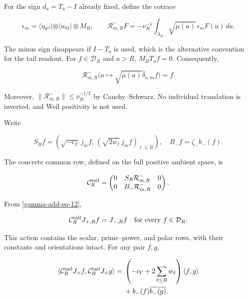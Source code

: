 For the sign \(d_a=T_a-I\) already fixed, define the cotrace

\begin{equation}
\epsilon_m=\langle\eta_{9^m}|\otimes\langle u_{81}|\otimes M_R,
\qquad
\mathcal R^-_{m,R}F
=-\nu_R^{-1}\int_{A_R}\sqrt{\mu(a)}\,\epsilon_m F(a)\,da.
\label{gamma-add-eq-11}
\end{equation}

The minus sign disappears if \(I-T_a\) is used, which is the alternative convention for the tail readout. For \(f\in\mathcal D_R\) and \(a>R\), \(M_RT_af=0\). Consequently,

\begin{equation}
\mathcal R^-_{m,R}
\bigl(a\mapsto\sqrt{\mu(a)}\widehat\delta_{a,m}f\bigr)=f.
\label{gamma-add-eq-12}
\end{equation}
\label{gamma-add:cola-lector}

Moreover, \(\|\mathcal R^-_{m,R}\|\le\nu_R^{-1/2}\) by Cauchy--Schwarz. No individual translation is inverted, and Weil positivity is not used.

Write

\begin{equation}
S_Rf=\left(\sqrt{-c_\Gamma}\,j_mf,\,
              (\sqrt{2w_\ell}\,j_mf)_{\ell\le R}\right),
\quad B_-f=\zeta_-b_-(f).
\label{gamma-add-display-28}
\end{equation}

The concrete common row, defined on the full positive ambient space, is

\begin{equation}
\mathcal C_R^{\rm tail}
=
\begin{pmatrix}
0&S_R\mathcal R^-_{m,R}&0\\
0&B_-\mathcal R^-_{m,R}&0
\end{pmatrix}.
\label{gamma-add-eq-13}
\end{equation}

From \eqref{gamma-add-eq-12},

\begin{equation}
\mathcal C_R^{\rm tail}J_{+,R}f=J_{-,R}f
\quad\hbox{for every }f\in\mathcal D_R.
\label{gamma-add-eq-14}
\end{equation}

This action contains the scalar, prime--power, and polar rows, with their constants and orientations intact. For any pair \(f,g\),

\begin{equation}
\begin{aligned}
\langle\mathcal C_R^{\rm tail}J_+f,\mathcal C_R^{\rm tail}J_+g\rangle
={}&\left(-c_\Gamma+2\sum_{\ell\le R}w_\ell\right)\langle f,g\rangle\\
&+b_-(f)\overline{b_-(g)}.
\end{aligned}
\label{gamma-add-eq-15}
\end{equation}

